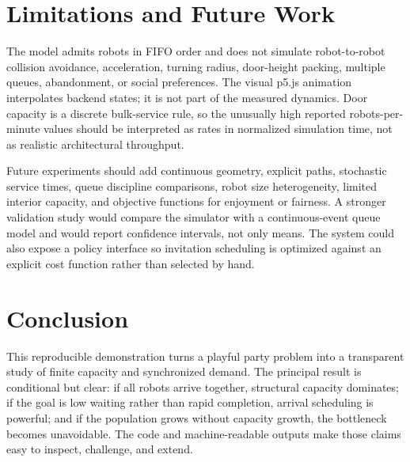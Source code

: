 \documentclass[11pt]{article}
\begin{document}
\section{Limitations and Future Work}
The model admits robots in FIFO order and does not simulate robot-to-robot collision avoidance, acceleration, turning radius, door-height packing, multiple queues, abandonment, or social preferences. The visual p5.js animation interpolates backend states; it is not part of the measured dynamics. Door capacity is a discrete bulk-service rule, so the unusually high reported robots-per-minute values should be interpreted as rates in normalized simulation time, not as realistic architectural throughput.

Future experiments should add continuous geometry, explicit paths, stochastic service times, queue discipline comparisons, robot size heterogeneity, limited interior capacity, and objective functions for enjoyment or fairness. A stronger validation study would compare the simulator with a continuous-event queue model and would report confidence intervals, not only means. The system could also expose a policy interface so invitation scheduling is optimized against an explicit cost function rather than selected by hand.

\section{Conclusion}
This reproducible demonstration turns a playful party problem into a transparent study of finite capacity and synchronized demand. The principal result is conditional but clear: if all robots arrive together, structural capacity dominates; if the goal is low waiting rather than rapid completion, arrival scheduling is powerful; and if the population grows without capacity growth, the bottleneck becomes unavoidable. The code and machine-readable outputs make those claims easy to inspect, challenge, and extend.



\end{document}
